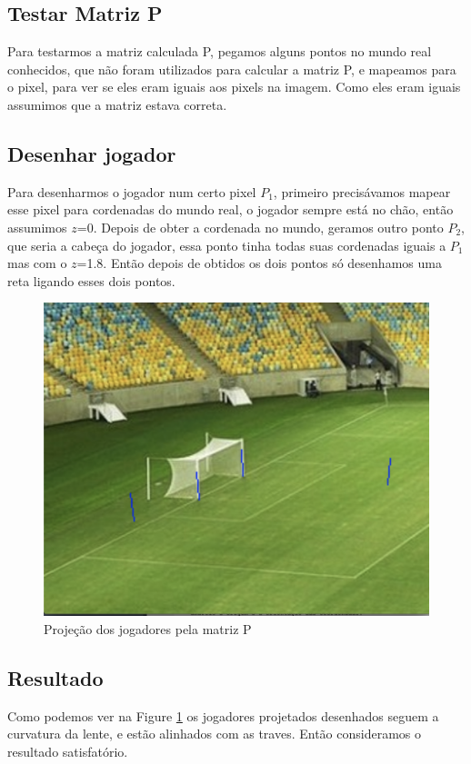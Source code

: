 \documentclass{article}
\begin{document}
    \subsection{Testar Matriz P}
    Para testarmos a matriz calculada P, pegamos alguns pontos  no mundo real conhecidos, que não foram utilizados para calcular a matriz P, e mapeamos para o pixel, para ver se eles eram iguais aos pixels na imagem. Como eles eram iguais assumimos que a matriz estava correta.
    \subsection{Desenhar jogador}
    Para desenharmos o jogador num certo pixel \(P_1\), primeiro precisávamos mapear esse pixel para cordenadas do mundo real, o jogador sempre está no chão, então assumimos \(z\)=0. Depois de obter a cordenada no mundo, geramos outro ponto \(P_2\), que seria a cabeça do jogador, essa ponto tinha todas suas cordenadas iguais a \(P_1\) mas com o \(z\)=1.8. Então depois de obtidos os dois pontos só desenhamos uma reta ligando esses dois pontos.
    \begin{figure}[h!]
    \includegraphics[scale=0.4]{jogadore1.png}
    \caption{Projeção dos jogadores pela matriz P}
    \label{fig:resultado1}
    \end{figure}
    \subsection{Resultado}
    Como podemos ver na Figure \ref{fig:resultado1} os jogadores projetados desenhados seguem a curvatura da lente, e estão alinhados com as traves. Então consideramos o resultado satisfatório.
\end{document}
